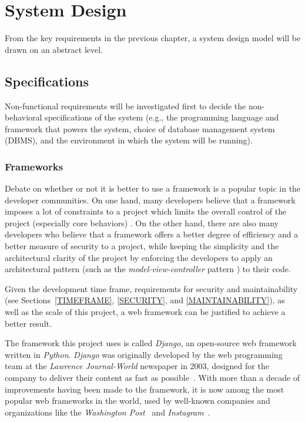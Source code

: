 

\chapter{System Design}
\label{chap:SYSDES}

From the key requirements in the previous chapter,
a system design model will be drawn on an abstract level.

\section{Specifications}
Non-functional requirements will be investigated first to decide the
non-behavioral specifications of the system (e.g., the
programming language and framework that powers the system, choice of database
management system (DBMS),
and the environment in which the system will be running).

\subsection{Frameworks}
Debate on whether or not it is better to use a framework is
a popular topic in the developer communities. On one hand, many developers
believe that a framework imposes a lot of constraints to a project which limits the
overall control of the project (especially core behaviors) \cite{frameworks}.
On the other hand, there are also many developers who believe that a framework
offers a better degree of efficiency and a better
measure of security to a project, while keeping the simplicity and
the architectural clarity of the project by enforcing the developers to apply
an architectural pattern (such as the \emph{model-view-controller} pattern
\cite{mvc}) to their code.

\medskip

Given the development time frame, requirements for
security and maintainability (see Sections~\ref{TIMEFRAME},
\ref{SECURITY}, and \ref{MAINTAINABILITY}),
as well as the scale of this project,
a web framework can be justified to achieve a better result.

\medskip

The framework this project uses is called \emph{Django}, an open-source web
framework written in \emph{Python}. \emph{Django} was originally developed by
the web programming team at the \emph{Lawrence Journal-World} newspaper in 2003,
designed for the company to deliver their content as fast as
possible~\cite[Chapter 1]{django}.
With more than a decade of improvements
having been made to the framework, it is now among the most popular web
frameworks in the world, used by well-known companies and organizations like the
\emph{Washington Post}~\cite{djangoWashingtonPost}
and \emph{Instagram}~\cite{djangoInstagram}.
\medskip


